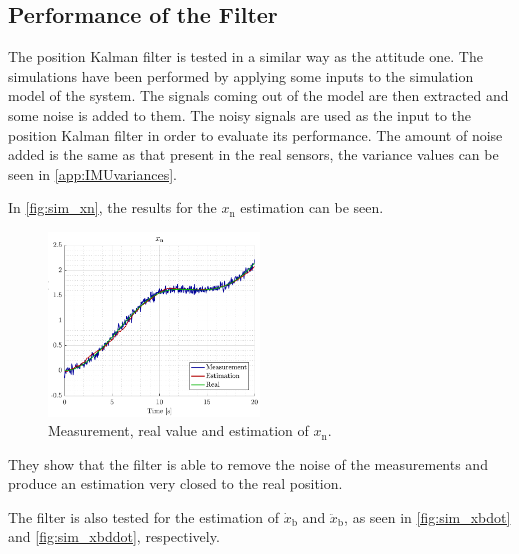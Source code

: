 \subsection{Performance of the Filter}
The position Kalman filter is tested in a similar way as the attitude one. The simulations have been performed by applying some inputs to the simulation model of the system. The signals coming out of the model are then extracted and some noise is added to them. The noisy signals are used as the input to the position Kalman filter in order to evaluate its performance. The amount of noise added is the same as that present in the real sensors, the variance values can be seen in \autoref{app:IMUvariances}.

In \autoref{fig:sim_xn}, the results for the $x_\mathrm{n}$ estimation can be seen.
\begin{figure}[H]
    \includegraphics[width=0.5\textwidth]{figures/sim_xn}
    \caption{Measurement, real value and estimation of $x_\mathrm{n}$.}
    \label{fig:sim_xn}
\end{figure}

They show that the filter is able to remove the noise of the measurements and produce an estimation very closed to the real position.

The filter is also tested for the estimation of $\dot{x}_\mathrm{b}$ and $\ddot{x}_\mathrm{b}$, as seen in \autoref{fig:sim_xbdot} and \autoref{fig:sim_xbddot}, respectively.

